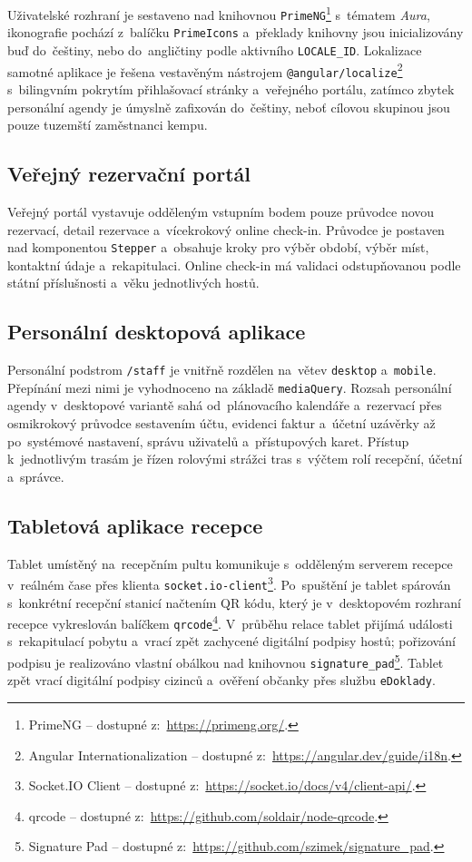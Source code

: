 Uživatelské rozhraní je sestaveno nad knihovnou \texttt{PrimeNG}\footnote{PrimeNG -- dostupné z:~\url{https://primeng.org/}.} s~tématem \emph{Aura}, ikonografie pochází z~balíčku \texttt{PrimeIcons} a~překlady knihovny jsou inicializovány buď do~češtiny, nebo do~angličtiny podle aktivního \texttt{LOCALE\_ID}.
Lokalizace samotné aplikace je řešena vestavěným nástrojem \texttt{@angular/localize}\footnote{Angular Internationalization -- dostupné z:~\url{https://angular.dev/guide/i18n}.} s~bilingvním pokrytím přihlašovací stránky a~veřejného portálu, zatímco zbytek personální agendy je úmyslně zafixován do~češtiny, neboť cílovou skupinou jsou pouze tuzemští zaměstnanci kempu.

\subsection{Veřejný rezervační portál}
\label{subsec:impl-clients-public}
Veřejný portál vystavuje odděleným vstupním bodem pouze průvodce novou rezervací, detail rezervace a~vícekrokový online check-in.
Průvodce je postaven nad komponentou \texttt{Stepper} a~obsahuje kroky pro výběr období, výběr míst, kontaktní údaje a~rekapitulaci.
Online check-in má validaci odstupňovanou podle státní příslušnosti a~věku jednotlivých hostů.

\subsection{Personální desktopová aplikace}
\label{subsec:impl-clients-desktop}
Personální podstrom \texttt{/staff} je vnitřně rozdělen na~větev \texttt{desktop} a~\texttt{mobile}.
Přepínání mezi nimi je vyhodnoceno na základě \texttt{mediaQuery}.
Rozsah personální agendy v~desktopové variantě sahá od~plánovacího kalendáře a~rezervací přes osmikrokový průvodce sestavením účtu, evidenci faktur a~účetní uzávěrky až po~systémové nastavení, správu uživatelů a~přístupových karet.
Přístup k~jednotlivým trasám je řízen rolovými strážci tras s~výčtem rolí recepční, účetní a~správce.

\subsection{Tabletová aplikace recepce}
\label{subsec:impl-clients-tablet}
Tablet umístěný na~recepčním pultu komunikuje s~odděleným serverem recepce v~reálném čase přes klienta \texttt{socket.io-client}\footnote{Socket.IO Client -- dostupné z:~\url{https://socket.io/docs/v4/client-api/}.}.
Po~spuštění je tablet spárován s~konkrétní recepční stanicí načtením QR kódu, který je v~desktopovém rozhraní recepce vykreslován balíčkem \texttt{qrcode}\footnote{qrcode -- dostupné z:~\url{https://github.com/soldair/node-qrcode}.}.
V~průběhu relace tablet přijímá události s~rekapitulací pobytu a~vrací zpět zachycené digitální podpisy hostů; pořizování podpisu je realizováno vlastní obálkou nad knihovnou \texttt{signature\_pad}\footnote{Signature Pad -- dostupné z:~\url{https://github.com/szimek/signature_pad}.}.
Tablet zpět vrací digitální podpisy cizinců a~ověření občanky přes službu \texttt{eDoklady}.

